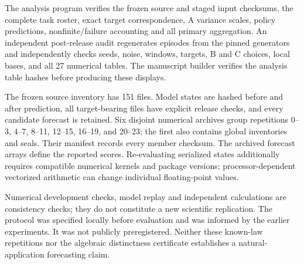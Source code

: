 The analysis program verifies the frozen source and staged input checksums,
the complete task roster, exact target correspondence, A variance scales,
policy predictions, nonfinite/failure accounting and all primary aggregation.
An independent post-release audit regenerates episodes from the pinned
generators and independently checks seeds, noise, windows, targets,
B and C choices, local bases, and all 27 numerical tables. The manuscript
builder verifies the analysis table hashes before producing these displays.

The frozen source inventory has 151 files. Model states are hashed before
and after prediction, all target-bearing files have explicit release
checks, and every candidate forecast is retained. Six disjoint numerical
archives group repetitions 0--3, 4--7, 8--11, 12--15, 16--19, and 20--23;
the first also contains global inventories and seals. Their manifest
records every member checksum. The archived forecast arrays define the
reported scores. Re-evaluating serialized states additionally requires
compatible numerical kernels and package versions; processor-dependent
vectorized arithmetic can change individual floating-point values.

Numerical
development checks, model replay and independent calculations are consistency
checks; they do not constitute a new scientific replication. The protocol was specified locally before evaluation and was informed
by the earlier experiments. It was not publicly preregistered. Neither these known-law repetitions nor the algebraic
distinctness certificate establishes a natural-application forecasting claim.

